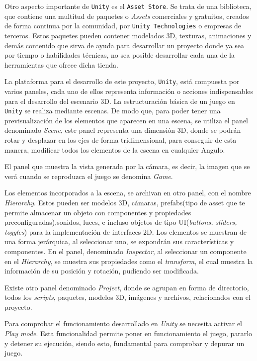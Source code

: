 Otro aspecto importante de \texttt{Unity} es el \texttt{Asset Store}. Se trata de una biblioteca, que contiene una multitud de paquetes o \textit{Assets} comerciales y gratuitos, creados de forma continua por la comunidad, por \texttt{Unity Technologies} o empresas de terceros. Estos paquetes pueden contener modelados 3D, texturas, animaciones y demás contenido que sirva de ayuda para desarrollar un proyecto donde ya sea por tiempo o habilidades técnicas, no sea posible desarrollar cada una de la herramientas que ofrece dicha tienda.

La plataforma para el desarrollo de este proyecto, \texttt{Unity},  está compuesta por varios paneles, cada uno de ellos representa información o acciones indispensables para el desarrollo del escenario 3D. La estructuración básica de un juego en \texttt{Unity} se realiza mediante escenas.  De modo que, para poder tener una previsualización de los elementos que aparecen en una escena, se utiliza el panel denominado \textit{Scene}, este panel representa una dimensión 3D, donde se podrán rotar y desplazar en los ejes de forma tridimensional, para conseguir de esta manera, modificar todos los elementos de la escena en cualquier Angulo.

El panel que muestra la vista generada por la cámara, es decir, la imagen que se verá cuando se reproduzca el juego se denomina \textit{Game}.

Los elementos incorporados a la escena, se archivan en otro panel, con el nombre \textit{Hierarchy}. Estos pueden ser modelos 3D, cámaras, prefabs(tipo de asset que te permite almacenar un objeto con componentes y propiedades preconfiguradas),sonidos, luces, e incluso objetos de tipo UI(\textit{buttons, sliders, toggles}) para la implementación de interfaces 2D. Los elementos se muestran de una forma jerárquica, al seleccionar uno, se expondrán sus características y componentes. En el panel, denominado \textit{Inspector}, al seleccionar un componente en el \textit{Hierarchy}, se muestra sus propiedades como el \textit{transform}, el cual muestra la información de su posición y rotación, pudiendo ser modificada.

Existe otro panel denominado \textit{Project}, donde se agrupan en forma de directorio, todos los \textit{scripts}, paquetes, modelos 3D, imágenes y archivos, relacionados con el proyecto.

Para comprobar el funcionamiento desarrollado en \textit{Unity} se necesita activar el \textit{Play mode}. Esta funcionalidad permite poner en funcionamiento el juego, pararlo y detener su ejecución, siendo esto, fundamental para comprobar y depurar un juego\cite{Unity_Manual}.

